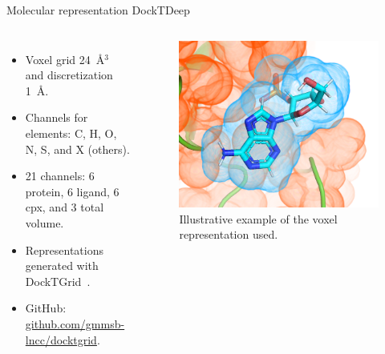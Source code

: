\documentclass[aspectratio=169,xcolor=dvipsnames]{beamer}
\begin{document}
\begin{frame}{Molecular representation \hfill {\footnotesize \alert{DockTDeep}}}
    \begin{columns}[c]
        \begin{itemize}
            \item Voxel grid 24~{\AA}$^3$ and discretization 1~{\AA}.
            \item Channels for elements: C, H, O, N, S, and X (others).
            \item 21 channels: 6 protein, 6 ligand, 6 cpx, and 3 total volume.
            \item Representations generated with DockTGrid~\cite{dadocktgrid}.
            \item GitHub: {\color{blue} \href{https://github.com/gmmsb-lncc/docktgrid}{github.com/gmmsb-lncc/docktgrid}}.
        \end{itemize}

        \begin{figure}
            \centering
            \includegraphics[width=0.9\linewidth]{imgs/cpx-representation.png}
            \caption{Illustrative example of the voxel representation used.}
        \end{figure}

    \end{columns}
\end{frame}
\end{document}
